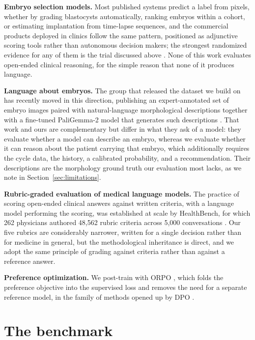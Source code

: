 \documentclass[11pt]{article}
\begin{document}
\textbf{Embryo selection models.} Most published systems predict a label from
pixels, whether by grading blastocysts automatically, ranking embryos within a
cohort, or estimating implantation from time-lapse sequences, and the commercial
products deployed in clinics follow the same pattern, positioned as adjunctive
scoring tools rather than autonomous decision makers; the strongest randomized
evidence for any of them is the trial discussed above \citep{illingworth2024}.
None of this work evaluates open-ended clinical reasoning, for the simple reason
that none of it produces language.

\textbf{Language about embryos.} The group that released the dataset we build on
has recently moved in this direction, publishing an expert-annotated set of
embryo images paired with natural-language morphological descriptions
\citep{neu2026dataset} together with a fine-tuned PaliGemma-2 model that generates
such descriptions \citep{neu2026invitrovision}. That work and ours are
complementary but differ in what they ask of a model: they evaluate whether a
model can describe an embryo, whereas we evaluate whether it can reason about the
patient carrying that embryo, which additionally requires the cycle data, the
history, a calibrated probability, and a recommendation. Their descriptions are
the morphology ground truth our evaluation most lacks, as we note in
Section~\ref{sec:limitations}.

\textbf{Rubric-graded evaluation of medical language models.} The practice of
scoring open-ended clinical answers against written criteria, with a language
model performing the scoring, was established at scale by HealthBench, for which
262 physicians authored 48,562 rubric criteria across 5,000 conversations
\citep{arora2025healthbench}. Our five rubrics are considerably narrower, written
for a single decision rather than for medicine in general, but the methodological
inheritance is direct, and we adopt the same principle of grading against
criteria rather than against a reference answer.

\textbf{Preference optimization.} We post-train with ORPO
\citep{hong2024orpo}, which folds the preference objective into the supervised
loss and removes the need for a separate reference model, in the family of
methods opened up by DPO \citep{rafailov2023dpo}.

\section{The benchmark}
\end{document}

